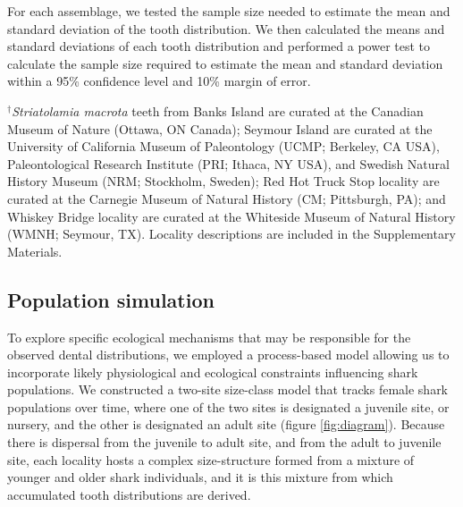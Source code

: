 \documentclass[]{rsos}%
\begin{document}
For each assemblage, we tested the sample size needed to estimate the mean and standard deviation of the tooth distribution. 
We then calculated the means and standard deviations of each tooth distribution and performed a power test to calculate the sample size required to estimate the mean and standard deviation within a 95\% confidence level and 10\% margin of error. 

${}^\dag$\emph{Striatolamia macrota} teeth from Banks Island are curated at the Canadian Museum of Nature (Ottawa, ON Canada); Seymour Island are curated at the University of California Museum of Paleontology (UCMP; Berkeley, CA USA), Paleontological Research Institute (PRI; Ithaca, NY USA), and Swedish Natural History Museum (NRM; Stockholm, Sweden); Red Hot Truck Stop locality are curated at the Carnegie Museum of Natural History (CM; Pittsburgh, PA); and Whiskey Bridge locality are curated at the Whiteside Museum of Natural History (WMNH; Seymour, TX). Locality descriptions are included in the Supplementary Materials.





\subsection{Population simulation}

To explore specific ecological mechanisms that may be responsible for the observed dental distributions, we employed a process-based model allowing us to incorporate likely physiological and ecological constraints influencing shark populations.
We constructed a two-site size-class model that tracks female shark populations over time, where one of the two sites is designated a juvenile site, or nursery, and the other is designated an adult site (figure \ref{fig:diagram}).
Because there is dispersal from the juvenile to adult site, and from the adult to juvenile site, each locality hosts a complex size-structure formed from a mixture of younger and older shark individuals, and it is this mixture from which accumulated tooth distributions are derived.
\end{document}
